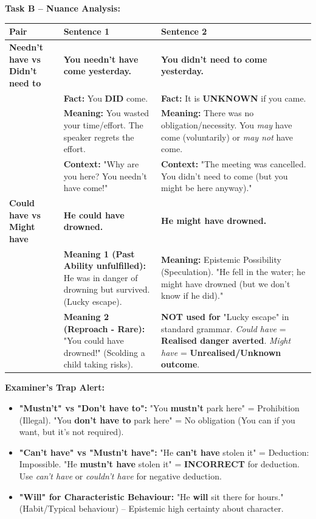 \documentclass[11pt]{article}
\newcommand{\cle}[1]{{\popxbold\color{popdark}#1}}
\begin{document}
\begin{exoresolu}
\textbf{Task B -- Nuance Analysis:}

\begin{center}
\begin{tabularx}{\linewidth}{|l|X|X|}
\hline
\rowcolor{popblueL} \textbf{Pair} & \textbf{Sentence 1} & \textbf{Sentence 2} \\
\hline
\textbf{Needn't have vs Didn't need to} & \textbf{You needn't have come yesterday.} & \textbf{You didn't need to come yesterday.} \\
& \textbf{Fact:} You \textbf{DID} come. & \textbf{Fact:} It is \textbf{UNKNOWN} if you came. \\
& \textbf{Meaning:} You wasted your time/effort. The speaker regrets the effort. & \textbf{Meaning:} There was no obligation/necessity. You \emph{may} have come (voluntarily) or \emph{may not} have come. \\
& \textbf{Context:} "Why are you here? You needn't have come!" & \textbf{Context:} "The meeting was cancelled. You didn't need to come (but you might be here anyway)." \\
\hline
\textbf{Could have vs Might have} & \textbf{He could have drowned.} & \textbf{He might have drowned.} \\
& \textbf{Meaning 1 (Past Ability unfulfilled):} He was in danger of drowning but survived. (Lucky escape). & \textbf{Meaning:} \cle{Epistemic Possibility} (Speculation). "He fell in the water; he might have drowned (but we don't know if he did)." \\
& \textbf{Meaning 2 (Reproach - Rare):} "You could have drowned!" (Scolding a child taking risks). & \textbf{NOT used for} "Lucky escape" in standard grammar. \textit{Could have} = \textbf{Realised danger averted}. \textit{Might have} = \textbf{Unrealised/Unknown outcome}. \\
\hline
\end{tabularx}
\end{center}

\textbf{Examiner's Trap Alert:}
\begin{itemize}
    \item \textbf{"Mustn't" vs "Don't have to":} "You \textbf{mustn't} park here" = Prohibition (Illegal). "You \textbf{don't have to} park here" = No obligation (You can if you want, but it's not required).
    \item \textbf{"Can't have" vs "Mustn't have":} "He \textbf{can't have} stolen it" = \cle{Deduction: Impossible}. "He \textbf{mustn't have} stolen it" = \textbf{INCORRECT} for deduction. Use \textit{can't have} or \textit{couldn't have} for negative deduction.
    \item \textbf{"Will" for Characteristic Behaviour:} "He \textbf{will} sit there for hours." (Habit/Typical behaviour) -- Epistemic high certainty about character.
\end{itemize}
\end{exoresolu}
\end{document}
